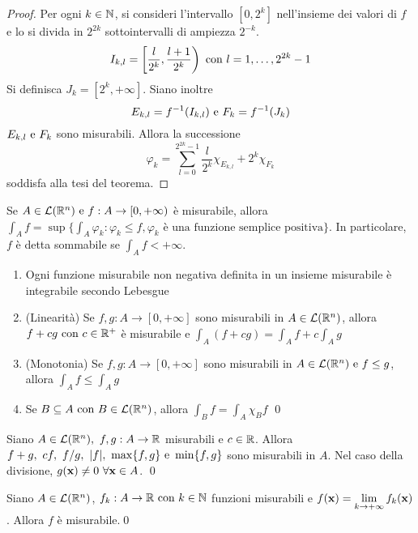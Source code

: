 \begin{proof}
	Per ogni $k\in \mathbb{N}$, si consideri l'intervallo $[0,2^k]$ nell'insieme dei valori di $f$ e lo si divida in $2^{2k}$ sottointervalli di ampiezza $2^{-k}$.
	$$
		I_{k,l}=\left[\frac{l}{2^k},\frac{l+1}{2^k}\right) \text{ con } l=1,\dots,2^{2k}-1
	$$
	Si definisca $J_k=[2^k,+\infty]$. Siano inoltre
	$$
		E_{k,l}=f^{-1}(I_{k,l}) \text{ e } F_k=f^{-1}(J_k)
	$$
	$E_{k,l} \text{ e } F_k$ sono misurabili. Allora la successione
	$$
		\varphi_k=\sum_{l=0}^{2^{2k}-1}\frac{l}{2^k}\chi_{E_{k,l}}+2^k\chi_{F_k}
	$$
	soddisfa alla tesi del teorema.   
\end{proof}

\begin{definition}
	Se $A\in \mathcal{L}(\mathbb{R}^n) \text{ e } f:A\to [0,+\infty)$ è misurabile, allora $\int_Af=\sup\{\int_A \varphi_k:\varphi_k \leq f, \varphi_k \text{ è una funzione semplice positiva}\}$. In particolare, $f$ è detta sommabile se $\int_A f<+\infty$.
\end{definition}

\begin{theorem}
	\leavevmode
	\begin{enumerate}
		\item Ogni funzione misurabile non negativa definita in un insieme misurabile è integrabile secondo Lebesgue
		\item (Linearità) Se $f,g:A\to [0,+\infty]$ sono misurabili in $A\in \mathcal{L}(\mathbb{R}^n)$, allora $f+cg \text{ con } c \in \mathbb{R}^+$ è misurabile e $\int_A (f+cg)=\int_Af+c\int_Ag$
		\item (Monotonia) Se $f,g:A\to[0,+\infty]$ sono misurabili in $A\in\mathcal{L}(\mathbb{R}^n) \text{ e } f\leq g$, allora $\int_Af\leq\int_Ag$
		\item Se $B\subseteq A \text{ con } B\in \mathcal{L}(\mathbb{R}^n)$, allora $\int_Bf=\int_A\chi_Bf$
		\qed
	\end{enumerate}
\end{theorem}

\begin{theorem}
	Siano $A \in \mathcal{L}(\R^n), \ f,g:A\to\R$ misurabili e $c \in \mathbb{R}$. Allora $f+g,\ cf,\ f/g,\ \abs{f},\ \max\{f,g\} \e \min\{f,g\}$ sono misurabili in $A$. Nel caso della divisione, $g(\vb{x})\neq 0 \ \forall \vb{x} \in A$.
	\qed
\end{theorem}

\begin{theorem}
	Siano $A \in \mathcal{L}(\mathbb{R}^n)$, $f_k:A\to\mathbb{R} \text{ con } k \in \mathbb{N}$ funzioni misurabili e $f(\vb{x})=\lim\limits_{k\to+\infty}f_k(\vb{x})$. Allora $f$ è misurabile.\qed
\end{theorem}

